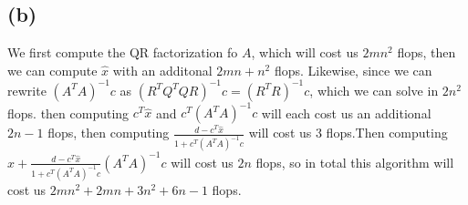 \subsection*{(b)}
We first compute the QR factorization fo $A$, which will cost us $2mn^2$ flops, 
then we can compute 
$\hat{x}$ with an additonal $2mn+n^2$ flops. Likewise,
since we can rewrite $(A^TA)^{-1}c$ as $(R^TQ^TQR)^{-1}c=(R^TR)^{-1}c$, which 
we can solve in $2n^2$ flops. then computing $c^T\hat{x}$ and $c^T(A^TA)^{-1}c$ will
each cost us an additional $2n-1$ flops, then computing $\frac{d-c^T\hat{x}}{1+c^T(A^TA)^{-1}c}$ will 
cost us 3 flops.Then computing $\hat{x}+\frac{d-c^T\hat{x}}{1+c^T(A^TA)^{-1}c}(A^TA)^{-1}c$
will cost us $2n$ flops, so in total this algorithm will cost us 
$\boxed{2mn^2+2mn+3n^2+6n-1}$ flops.





